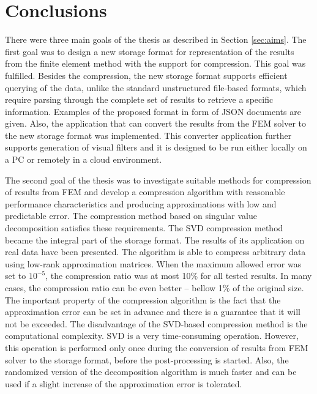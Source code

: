 \chapter{Conclusions}
\label{chapter:conclusions}


There were three main goals of the thesis as described in Section \ref{sec:aims}. The first goal was to design a new storage format for representation of the results from the finite element method with the support for compression. This goal was fulfilled. Besides the compression, the new storage format supports efficient querying of the data, unlike the standard unstructured file-based formats, which require parsing through the complete set of results to retrieve a specific information. Examples of the proposed format in form of JSON documents are given. Also, the application that can convert the results from the FEM solver to the new storage format was implemented. This converter application further supports generation of visual filters and it is designed to be run either locally on a PC or remotely in a cloud environment.

The second goal of the thesis was to investigate suitable methods for compression of results from FEM and develop a compression algorithm with reasonable performance characteristics and producing approximations with low and predictable error. The compression method based on singular value decomposition satisfies these requirements. The SVD compression method became the integral part of the storage format. The results of its application on real data have been presented. The algorithm is able to compress arbitrary data using low-rank approximation matrices. When the maximum allowed error was set to $10^{-5}$, the compression ratio was at most 10\% for all tested results. In many cases, the compression ratio can be even better -- bellow 1\% of the original size. The important property of the compression algorithm is the fact that the approximation error can be set in advance and there is a guarantee that it will not be exceeded. The disadvantage of the SVD-based compression method is the computational complexity. SVD is a very time-consuming operation. However, this operation is performed only once during the conversion of results from FEM solver to the storage format, before the post-processing is started. Also, the randomized version of the decomposition algorithm is much faster and can be used if a slight increase of the approximation error is tolerated.

